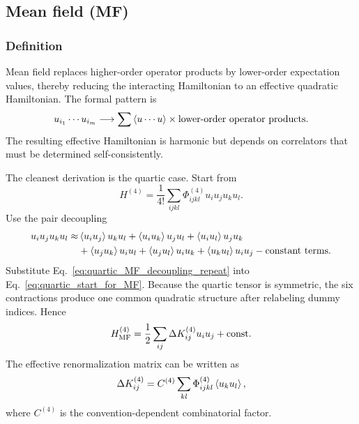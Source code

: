 \subsection{Mean field (MF)}
\subsubsection{Definition}
Mean field replaces higher-order operator products by lower-order expectation values, thereby reducing the interacting Hamiltonian to an effective quadratic Hamiltonian. The formal pattern is
\begin{equation}
    u_{i_1}\cdots u_{i_m}
    \longrightarrow
    \sum \left\langle u\cdots u \right\rangle\times \text{lower-order operator products}.
    \label{eq:MF_operator_pattern}
\end{equation}
The resulting effective Hamiltonian is harmonic but depends on correlators that must be determined self-consistently.

The cleanest derivation is the quartic case. Start from
\begin{equation}
    H^{(4)} = \frac{1}{4!}\sum_{ijkl}\Phi^{(4)}_{ijkl}u_i u_j u_k u_l.
    \label{eq:quartic_start_for_MF}
\end{equation}
Use the pair decoupling
\begin{align}
    u_i u_j u_k u_l
    \approx
    &\left\langle u_i u_j \right\rangle u_k u_l
    + \left\langle u_i u_k \right\rangle u_j u_l
    + \left\langle u_i u_l \right\rangle u_j u_k \\
    &+ \left\langle u_j u_k \right\rangle u_i u_l
    + \left\langle u_j u_l \right\rangle u_i u_k
    + \left\langle u_k u_l \right\rangle u_i u_j
    - \text{constant terms}.
    \label{eq:quartic_MF_decoupling_repeat}
\end{align}
Substitute Eq.~\eqref{eq:quartic_MF_decoupling_repeat} into Eq.~\eqref{eq:quartic_start_for_MF}. Because the quartic tensor is symmetric, the six contractions produce one common quadratic structure after relabeling dummy indices. Hence
\begin{equation}
    H^{(4)}_{\rm MF}
    =
    \frac{1}{2}\sum_{ij}\Delta K^{(4)}_{ij}u_i u_j + \mathrm{const}.
    \label{eq:quartic_MF_effective_hamiltonian}
\end{equation}
The effective renormalization matrix can be written as
\begin{equation}
    \Delta K^{(4)}_{ij}
    =
    C^{(4)}\sum_{kl}\Phi^{(4)}_{ijkl}\left\langle u_k u_l \right\rangle,
    \label{eq:quartic_MF_deltaK_general}
\end{equation}
where $C^{(4)}$ is the convention-dependent combinatorial factor.

